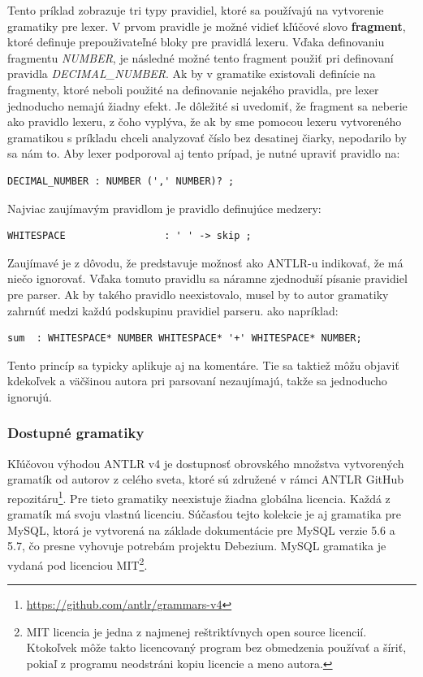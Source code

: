 Tento príklad zobrazuje tri typy pravidiel, ktoré sa používajú na vytvorenie gramatiky pre lexer. V prvom pravidle je možné vidieť kľúčové slovo \textbf{fragment}, ktoré definuje prepouživateľné bloky pre pravidlá lexeru. Vďaka definovaniu fragmentu \textit{NUMBER}, je následné možné tento fragment použiť pri definovaní pravidla \textit{DECIMAL\_NUMBER}. Ak by v gramatike existovali definície na fragmenty, ktoré neboli použité na definovanie nejakého pravidla, pre lexer jednoducho nemajú žiadny efekt. Je dôležité si uvedomiť, že fragment sa neberie ako pravidlo lexeru, z čoho vyplýva, že ak by sme pomocou lexeru vytvoreného gramatikou s príkladu chceli analyzovať číslo bez desatinej čiarky, nepodarilo by sa nám to. Aby lexer podporoval aj tento prípad, je nutné upraviť pravidlo na:

\begin{lstlisting}[basicstyle=\small]
DECIMAL_NUMBER : NUMBER (',' NUMBER)? ;
\end{lstlisting}

Najviac zaujímavým pravidlom je pravidlo definujúce medzery:

\begin{lstlisting}[basicstyle=\small]
WHITESPACE                 : ' ' -> skip ;
\end{lstlisting}

Zaujímavé je z dôvodu, že predstavuje možnosť ako ANTLR-u indikovať, že má niečo ignorovať. Vďaka tomuto pravidlu sa náramne zjednoduší písanie pravidiel pre parser. Ak by takého pravidlo neexistovalo, musel by to autor gramatiky zahrnúť medzi každú podskupinu pravidiel parseru. ako napríklad:
\begin{lstlisting}[basicstyle=\small]
sum  : WHITESPACE* NUMBER WHITESPACE* '+' WHITESPACE* NUMBER;
\end{lstlisting}

Tento princíp sa typicky aplikuje aj na komentáre. Tie sa taktiež môžu objaviť kdekoľvek a väčšinou autora pri parsovaní nezaujímajú, takže sa jednoducho ignorujú.

\subsubsection{Dostupné gramatiky}
Kľúčovou výhodou ANTLR v4 je dostupnosť obrovského množstva vytvorených gramatík od autorov z celého sveta, ktoré sú združené v rámci ANTLR GitHub repozitáru\footnote{\url{https://github.com/antlr/grammars-v4}}. Pre tieto gramatiky neexistuje žiadna globálna licencia. Každá z gramatík má svoju vlastnú licenciu. Súčasťou tejto kolekcie je aj gramatika pre MySQL, ktorá je vytvorená na základe dokumentácie pre MySQL verzie 5.6 a 5.7, čo presne vyhovuje potrebám projektu Debezium. MySQL gramatika je vydaná pod licenciou MIT\footnote{MIT licencia je jedna z najmenej reštriktívnych open source licencií. Ktokoľvek môže takto licencovaný program bez obmedzenia používať a šíriť, pokiaľ z programu neodstráni kopiu licencie a meno autora.}.

